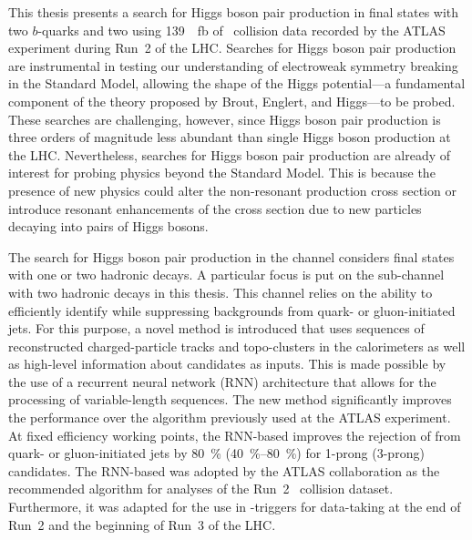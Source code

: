 This thesis presents a search for Higgs boson pair production in final states
with two $b$-quarks and two \tauleptons using \SI{139}{\per\femto\barn} of
\pp~collision data recorded by the ATLAS experiment during Run~2 of the
LHC. Searches for Higgs boson pair production are instrumental in testing our
understanding of electroweak symmetry breaking in the Standard Model, allowing
the shape of the Higgs potential---a fundamental component of the theory
proposed by Brout, Englert, and Higgs---to be probed. These searches are
challenging, however, since Higgs boson pair production is three orders of
magnitude less abundant than single Higgs boson production at the
LHC. Nevertheless, searches for Higgs boson pair production are already of
interest for probing physics beyond the Standard Model. This is because the
presence of new physics could alter the non-resonant \HH production cross
section or introduce resonant enhancements of the cross section due to new
particles decaying into pairs of Higgs bosons.


The search for Higgs boson pair production in the \bbtautau channel considers
final states with one or two hadronic \taulepton decays. A particular focus is
put on the sub-channel with two hadronic \taulepton decays in this thesis. This
channel relies on the ability to efficiently identify \tauhadvis while
suppressing backgrounds from quark- or gluon-initiated jets. For this purpose, a
novel \tauid method is introduced that uses sequences of reconstructed
charged-particle tracks and topo-clusters in the calorimeters as well as
high-level information about \tauhadvis candidates as inputs. This is made
possible by the use of a recurrent neural network (RNN) architecture that allows
for the processing of variable-length sequences. The new method significantly
improves the \tauid performance over the %
algorithm previously used at the ATLAS experiment. At fixed \tauhadvis
efficiency working points, the RNN-based \tauid improves the rejection of
\faketauhadvis from quark- or gluon-initiated jets by \SI{80}{\percent}
(\SIrange[range-units=single]{40}{80}{\percent}) for 1-prong (3-prong)
\tauhadvis candidates.
The RNN-based \tauid was adopted by the ATLAS collaboration as the recommended
\tauid algorithm for analyses of the Run~2 \pp~collision dataset. Furthermore,
it was adapted for the use in \tauhadvis-triggers for data-taking at the end of
Run~2 and the beginning of Run~3 of the LHC.


